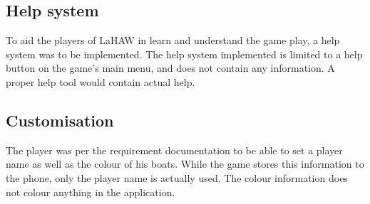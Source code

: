 \subsection{Help system}
To aid the players of LaHAW in learn and understand the game play, a help system was to be implemented. The help system implemented is limited to a help button on the game's main menu, and does not contain any information. A proper help tool would contain actual help.

\subsection{Customisation}
The player was per the requirement documentation to be able to set a player name as well as the colour of his boats. While the game stores this information to the phone, only the player name is actually used. The colour information does not colour anything in the application.